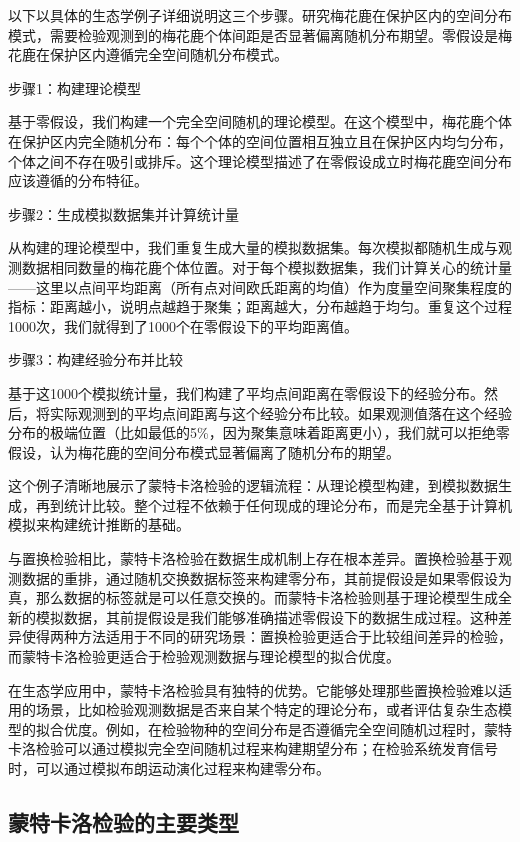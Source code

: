\documentclass[
  twoside,12pt,fontset=none]{ctexbook}
\begin{document}
以下以具体的生态学例子详细说明这三个步骤。研究梅花鹿在保护区内的空间分布模式，需要检验观测到的梅花鹿个体间距是否显著偏离随机分布期望。零假设是梅花鹿在保护区内遵循完全空间随机分布模式。

步骤1：构建理论模型

基于零假设，我们构建一个完全空间随机的理论模型。在这个模型中，梅花鹿个体在保护区内完全随机分布：每个个体的空间位置相互独立且在保护区内均匀分布，个体之间不存在吸引或排斥。这个理论模型描述了在零假设成立时梅花鹿空间分布应该遵循的分布特征。

步骤2：生成模拟数据集并计算统计量

从构建的理论模型中，我们重复生成大量的模拟数据集。每次模拟都随机生成与观测数据相同数量的梅花鹿个体位置。对于每个模拟数据集，我们计算关心的统计量------这里以点间平均距离（所有点对间欧氏距离的均值）作为度量空间聚集程度的指标：距离越小，说明点越趋于聚集；距离越大，分布越趋于均匀。重复这个过程1000次，我们就得到了1000个在零假设下的平均距离值。

步骤3：构建经验分布并比较

基于这1000个模拟统计量，我们构建了平均点间距离在零假设下的经验分布。然后，将实际观测到的平均点间距离与这个经验分布比较。如果观测值落在这个经验分布的极端位置（比如最低的5\%，因为聚集意味着距离更小），我们就可以拒绝零假设，认为梅花鹿的空间分布模式显著偏离了随机分布的期望。

这个例子清晰地展示了蒙特卡洛检验的逻辑流程：从理论模型构建，到模拟数据生成，再到统计比较。整个过程不依赖于任何现成的理论分布，而是完全基于计算机模拟来构建统计推断的基础。

与置换检验相比，蒙特卡洛检验在数据生成机制上存在根本差异。置换检验基于观测数据的重排，通过随机交换数据标签来构建零分布，其前提假设是如果零假设为真，那么数据的标签就是可以任意交换的。而蒙特卡洛检验则基于理论模型生成全新的模拟数据，其前提假设是我们能够准确描述零假设下的数据生成过程。这种差异使得两种方法适用于不同的研究场景：置换检验更适合于比较组间差异的检验，而蒙特卡洛检验更适合于检验观测数据与理论模型的拟合优度。

在生态学应用中，蒙特卡洛检验具有独特的优势。它能够处理那些置换检验难以适用的场景，比如检验观测数据是否来自某个特定的理论分布，或者评估复杂生态模型的拟合优度。例如，在检验物种的空间分布是否遵循完全空间随机过程时，蒙特卡洛检验可以通过模拟完全空间随机过程来构建期望分布；在检验系统发育信号时，可以通过模拟布朗运动演化过程来构建零分布。

\hypertarget{ux8499ux7279ux5361ux6d1bux68c0ux9a8cux7684ux4e3bux8981ux7c7bux578b}{%
\subsection{蒙特卡洛检验的主要类型}\label{ux8499ux7279ux5361ux6d1bux68c0ux9a8cux7684ux4e3bux8981ux7c7bux578b}}
\end{document}
